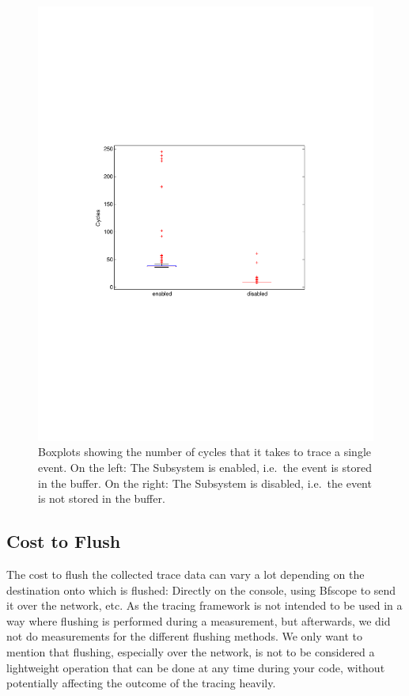 \documentclass[a4paper,11pt,twoside]{report}
\begin{document}
\begin{figure}[htb]
	\includegraphics[width=1\textwidth]{images/boxplot.pdf}
	\caption{Boxplots showing the number of cycles that it takes to trace a
	single event. On the left: The Subsystem is enabled, i.e.~the event is
stored in the buffer. On the right: The Subsystem is disabled, i.e.~the event is
not stored in the buffer.}
	\label{fig:boxplot}
\end{figure}

\subsection{Cost to Flush}

The cost to flush the collected trace data can vary a lot depending on the
destination onto which is flushed: Directly on the console, using Bfscope to
send it over the network, etc. As the tracing framework is not intended to be
used in a way where flushing is performed during a measurement, but afterwards,
we did not do measurements for the different flushing methods. We only want to
mention that flushing, especially over the network, is not to be considered a
lightweight operation that can be done at any time during your code, without
potentially affecting the outcome of the tracing heavily.

\end{document}
